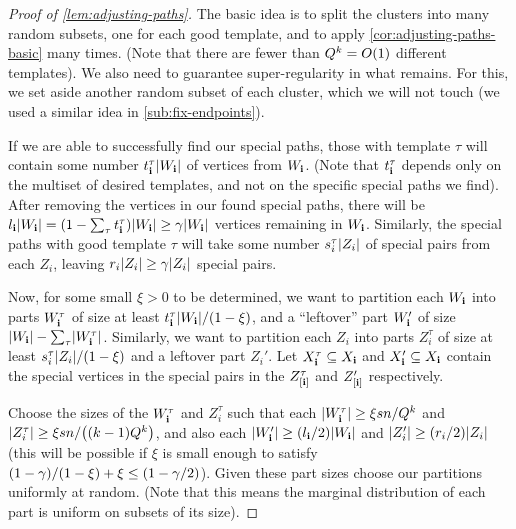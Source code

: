 \documentclass[11pt,english]{article}
\theoremstyle{plain}
\theoremstyle{plain}
\theoremstyle{plain}
\theoremstyle{plain}
\theoremstyle{plain}
\theoremstyle{definition}
\theoremstyle{definition}
\theoremstyle{remark}
\theoremstyle{remark}
\theoremstyle{plain}
\theoremstyle{definition}
\theoremstyle{definition}
\theoremstyle{plain}
\theoremstyle{plain}
\theoremstyle{plain}
\theoremstyle{plain}
\theoremstyle{remark}
\theoremstyle{plain}
\theoremstyle{definition}
\let\originalleft\left
\let\originalright\right
\renewcommand{\left}{\mathopen{}\mathclose\bgroup\originalleft}
\renewcommand{\right}{\aftergroup\egroup\originalright}
\begin{document}
\begin{proof}[Proof of \ref{lem:adjusting-paths}]
The basic idea is to split the clusters into many random subsets,
one for each good template, and to apply \ref{cor:adjusting-paths-basic}
many times. (Note that there are fewer than $Q^{k}=O\left(1\right)$
different templates). We also need to guarantee super-regularity in
what remains. For this, we set aside another random subset of each
cluster, which we will not touch (we used a similar idea in \ref{sub:fix-endpoints}).

If we are able to successfully find our special paths, those with
template $\tau$ will contain some number $t_{\bi}^{\tau}\left|W_{\bi}\right|$
of vertices from $W_{\mathbf{i}}$. (Note that $t_{\mathbf{i}}^{\tau}$ depends
only on the multiset of desired templates, and not on the specific
special paths we find). After removing the vertices in our found special
paths, there will be $l_{\bi}\left|W_{\bi}\right|=\left(1-\sum_{\tau}t_{\bi}^{\tau}\right)\left|W_{\bi}\right|\ge\gamma\left|W_{\bi}\right|$
vertices remaining in $W_{\mathbf{i}}$. Similarly, the special paths with
good template $\tau$ will take some number $s_{i}^{\tau}\left|Z_{i}\right|$
of special pairs from each $Z_{i}$, leaving $r_{i}\left|Z_{i}\right|\ge\gamma\left|Z_{i}\right|$
special pairs.

Now, for some small $\xi>0$ to be determined, we want to partition
each $W_{\mathbf{i}}$ into parts $W_{\mathbf{i}}^{\tau}$ of size at least $t_{\bi}^{\tau}\left|W_{\bi}\right|/\left(1-\xi\right)$,
and a ``leftover'' part $W_{\mathbf{i}}'$ of size $\left|W_{\bi}\right|-\sum_{\tau}\left|W_{\bi}^{\tau}\right|$.
Similarly, we want to partition each $Z_{i}$ into parts $Z_{i}^{\tau}$
of size at least $s_{i}^{\tau}\left|Z_{i}\right|/\left(1-\xi\right)$
and a leftover part $Z_{i}'$. Let $X_{\mathbf{i}}^{\tau}\subseteq X_{\mathbf{i}}$
and $X_{\mathbf{i}}'\subseteq X_{\mathbf{i}}$ contain the special vertices in the
special pairs in the $Z_{\left[\bi\right]}^{\tau}$ and $Z_{\left[\bi\right]}'$
respectively.

Choose the sizes of the $W_{\mathbf{i}}^{\tau}$ and $Z_{i}^{\tau}$ such
that each $\left|W_{\bi}^{\tau}\right|\ge\xi sn/Q^{k}$ and $\left|Z_{i}^{\tau}\right|\ge\xi sn/\left(\left(k-1\right)Q^{k}\right)$,
and also each $\left|W_{\bi}'\right|\ge\left(l_{\bi}/2\right)\left|W_{\bi}\right|$
and $\left|Z_{i}'\right|\ge\left(r_{i}/2\right)\left|Z_{i}\right|$
(this will be possible if $\xi$ is small enough to satisfy $\left(1-\gamma\right)/\left(1-\xi\right)+\xi\le\left(1-\gamma/2\right)$).
Given these part sizes choose our partitions uniformly at random.
(Note that this means the marginal distribution of each part is uniform
on subsets of its size).


\end{proof}
\end{document}
